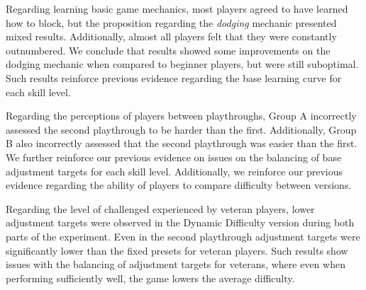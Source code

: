 Regarding learning basic game mechanics, most players agreed to have learned how to block, but the proposition regarding the \emph{dodging} mechanic presented mixed results. Additionally, almost all players felt that they were constantly outnumbered. We conclude that results showed some improvements on the dodging mechanic when compared to beginner players, but were still suboptimal. Such results reinforce previous evidence regarding the base learning curve for each skill level.

Regarding the perceptions of players between playthroughs, Group A incorrectly assessed the second playthrough to be harder than the first. Additionally, Group B also incorrectly assessed that the second playthrough was easier than the first. We further reinforce our previous evidence on issues on the balancing of base adjustment targets for each skill level. Additionally, we reinforce our previous evidence regarding the ability of players to compare difficulty between versions.


Regarding the level of challenged experienced by veteran players, lower adjustment targets were observed in the Dynamic Difficulty version during both parts of the experiment. Even in the second playthrough adjustment targets were significantly lower than the fixed presets for veteran players. Such results show issues with the balancing of adjustment targets for veterans, where even when performing sufficiently well, the game lowers the average difficulty. 

